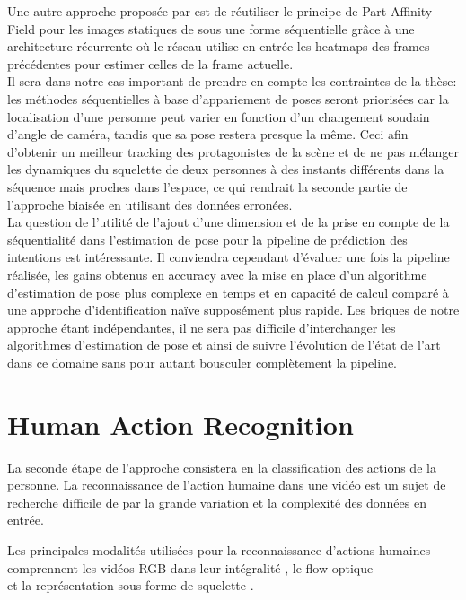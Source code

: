 Une autre approche proposée par \cite{Raaj_2019_CVPR} est de réutiliser le principe de Part Affinity Field pour les images statiques de \cite{cao2017realtime} sous une forme séquentielle grâce à une architecture récurrente où le réseau utilise en entrée les heatmaps des frames précédentes pour estimer celles de la frame actuelle.\\

Il sera dans notre cas important de prendre en compte les contraintes de la thèse: les méthodes séquentielles à base d'appariement de poses seront priorisées car la localisation d'une personne peut varier en fonction d'un changement soudain d'angle de caméra, tandis que sa pose restera presque la même. Ceci afin d'obtenir un meilleur tracking des protagonistes de la scène et de ne pas mélanger les dynamiques du squelette de deux personnes à des instants différents dans la séquence mais proches dans l'espace, ce qui rendrait la seconde partie de l'approche biaisée en utilisant des données erronées.\\

La question de l'utilité de l'ajout d'une dimension et de la prise en compte de la séquentialité dans l'estimation de pose pour la pipeline de prédiction des intentions est intéressante. Il conviendra cependant d'évaluer une fois la pipeline réalisée, les gains obtenus en accuracy avec la mise en place d'un algorithme d'estimation de pose plus complexe en temps et en capacité de calcul comparé à une approche d'identification naïve supposément plus rapide. Les briques de notre approche étant indépendantes, il ne sera pas difficile d'interchanger les algorithmes d'estimation de pose et ainsi de suivre l'évolution de l'état de l'art dans ce domaine sans pour autant bousculer complètement la pipeline.

\section{Human Action Recognition}
\label{subsec:HAR}

La seconde étape de l'approche consistera en la classification des actions de la personne. La reconnaissance de l'action humaine dans une vidéo est un sujet de recherche difficile de par la grande variation et la complexité des données en entrée.

Les principales modalités utilisées pour la reconnaissance d'actions humaines comprennent les vidéos RGB dans leur intégralité \cite{donahue2015long,2014arXiv1412.0767T,varol2017long,Wu_2018_CVPR}, le flow optique \cite{simonyan2014two}\\\cite{zhang2016real}\cite{sevilla2018integration,DanutPOP} et la représentation sous forme de squelette \cite{vemulapalli2014human,du2015hierarchical,2016arXiv160707043L,2018arXiv180107455Y}.

